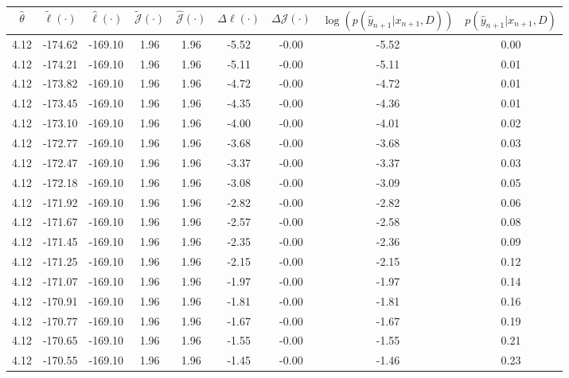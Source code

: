 \begin{table}[htbp]
        \centering
        \tiny
        \begin{adjustbox}{angle=90}
            \begin{tabular}{|c|c|c|c|c|c|c|c|c|}
                \hline
                 $\hat{\theta}$ & $\tilde{\ell}(\cdot)$ & $\hat{\ell}(\cdot)$ & $\tilde{\mathcal{J}}(\cdot)$ & $\hat{\mathcal{J}}(\cdot)$ & $\Delta \ell(\cdot)$ & $\Delta \mathcal{J}(\cdot)$ & $\log(p(\hat{y}_{n+1}|x_{n+1}, D))$ & $p(\hat{y}_{n+1}|x_{n+1}, D)$ \\
                \hline
                 4.12 & -174.62 & -169.10 & 1.96 & 1.96 & -5.52 & -0.00 & -5.52 & 0.00\\ \hline
 4.12 & -174.21 & -169.10 & 1.96 & 1.96 & -5.11 & -0.00 & -5.11 & 0.01\\ \hline
 4.12 & -173.82 & -169.10 & 1.96 & 1.96 & -4.72 & -0.00 & -4.72 & 0.01\\ \hline
 4.12 & -173.45 & -169.10 & 1.96 & 1.96 & -4.35 & -0.00 & -4.36 & 0.01\\ \hline
 4.12 & -173.10 & -169.10 & 1.96 & 1.96 & -4.00 & -0.00 & -4.01 & 0.02\\ \hline
 4.12 & -172.77 & -169.10 & 1.96 & 1.96 & -3.68 & -0.00 & -3.68 & 0.03\\ \hline
 4.12 & -172.47 & -169.10 & 1.96 & 1.96 & -3.37 & -0.00 & -3.37 & 0.03\\ \hline
 4.12 & -172.18 & -169.10 & 1.96 & 1.96 & -3.08 & -0.00 & -3.09 & 0.05\\ \hline
 4.12 & -171.92 & -169.10 & 1.96 & 1.96 & -2.82 & -0.00 & -2.82 & 0.06\\ \hline
 4.12 & -171.67 & -169.10 & 1.96 & 1.96 & -2.57 & -0.00 & -2.58 & 0.08\\ \hline
 4.12 & -171.45 & -169.10 & 1.96 & 1.96 & -2.35 & -0.00 & -2.36 & 0.09\\ \hline
 4.12 & -171.25 & -169.10 & 1.96 & 1.96 & -2.15 & -0.00 & -2.15 & 0.12\\ \hline
 4.12 & -171.07 & -169.10 & 1.96 & 1.96 & -1.97 & -0.00 & -1.97 & 0.14\\ \hline
 4.12 & -170.91 & -169.10 & 1.96 & 1.96 & -1.81 & -0.00 & -1.81 & 0.16\\ \hline
 4.12 & -170.77 & -169.10 & 1.96 & 1.96 & -1.67 & -0.00 & -1.67 & 0.19\\ \hline
 4.12 & -170.65 & -169.10 & 1.96 & 1.96 & -1.55 & -0.00 & -1.55 & 0.21\\ \hline
 4.12 & -170.55 & -169.10 & 1.96 & 1.96 & -1.45 & -0.00 & -1.46 & 0.23\\ \hline

\end{tabular}
\end{adjustbox}
\end{table}
